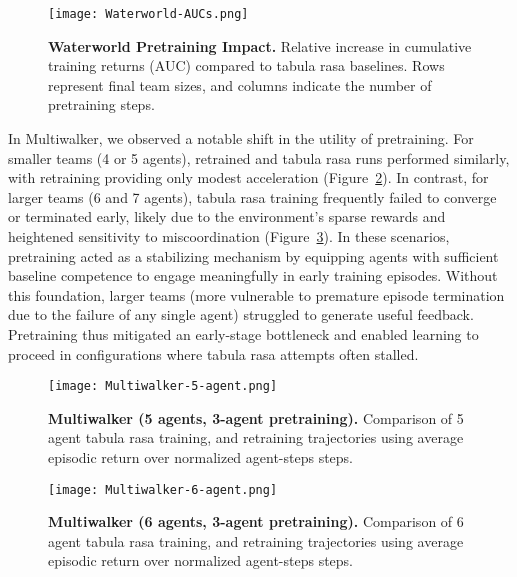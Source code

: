 \documentclass{article}
\begin{document}
\begin{figure}[h]
    \centering
    \texttt{[image: Waterworld-AUCs.png]}
    \caption{\textbf{Waterworld Pretraining Impact.} 
    Relative increase in cumulative training returns (AUC) compared to tabula rasa baselines. 
    Rows represent final team sizes, and columns indicate the number of pretraining steps.}
    \label{fig:waterworld-aucs}
\end{figure}

In Multiwalker, we observed a notable shift in the utility of pretraining. 
For smaller teams (4 or 5 agents), retrained and tabula rasa runs performed similarly, 
with retraining providing only modest acceleration (Figure~\ref{fig:multiwalker-5}). 
In contrast, for larger teams (6 and 7 agents), tabula rasa training frequently failed to 
converge or terminated early, likely due to the environment's sparse rewards and heightened 
sensitivity to miscoordination (Figure~\ref{fig:multiwalker-6}). 
In these scenarios, pretraining acted as a stabilizing mechanism by equipping agents 
with sufficient baseline competence to engage meaningfully in early training episodes. 
Without this foundation, larger teams (more vulnerable to premature episode termination 
due to the failure of any single agent) struggled to generate useful feedback. 
Pretraining thus mitigated an early-stage bottleneck and enabled learning to proceed 
in configurations where tabula rasa attempts often stalled.

\begin{figure}[!h]
    \centering
    \texttt{[image: Multiwalker-5-agent.png]}
    \caption{\textbf{Multiwalker (5 agents, 3-agent pretraining).} Comparison of 
    5 agent tabula rasa training, and retraining trajectories using average 
    episodic return over normalized agent-steps steps.}
    \label{fig:multiwalker-5}
\end{figure}

\vspace{2em}

\begin{figure}[!h]
    \centering
    \texttt{[image: Multiwalker-6-agent.png]}
    \caption{\textbf{Multiwalker (6 agents, 3-agent pretraining).} Comparison of 
    6 agent tabula rasa training, and retraining trajectories using average 
    episodic return over normalized agent-steps steps.}
    \label{fig:multiwalker-6}
\end{figure}
\end{document}
